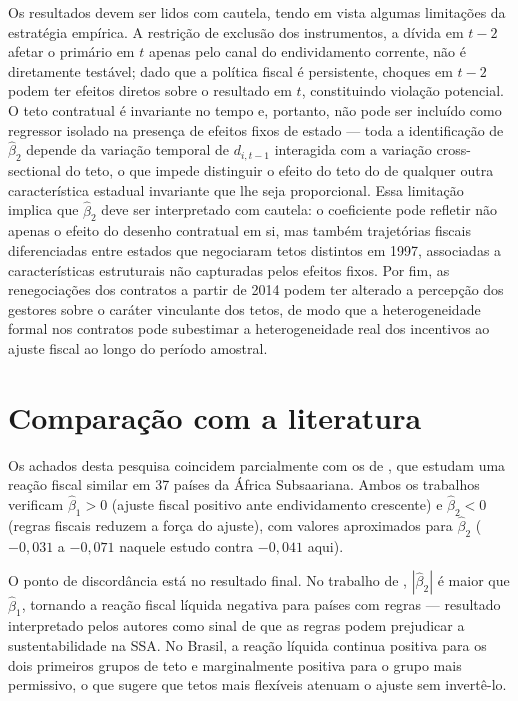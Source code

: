 Os resultados devem ser lidos com cautela, tendo em vista algumas limitações da estratégia empírica. A restrição de exclusão dos instrumentos, a dívida em $t-2$ afetar o primário em $t$ apenas pelo canal do endividamento corrente, não é diretamente testável; dado que a política fiscal é persistente, choques em $t-2$ podem ter efeitos diretos sobre o resultado em $t$, constituindo violação potencial. O teto contratual é invariante no tempo e, portanto, não pode ser incluído como regressor isolado na presença de efeitos fixos de estado --- toda a identificação de $\hat{\beta}_2$ depende da variação temporal de $d_{i,t-1}$ interagida com a variação cross-sectional do teto, o que impede distinguir o efeito do teto do de qualquer outra característica estadual invariante que lhe seja proporcional. Essa limitação implica que $\hat{\beta}_2$ deve ser interpretado com cautela: o coeficiente pode refletir não apenas o efeito do desenho contratual em si, mas também trajetórias fiscais diferenciadas entre estados que negociaram tetos distintos em 1997, associadas a características estruturais não capturadas pelos efeitos fixos. Por fim, as renegociações dos contratos a partir de 2014 podem ter alterado a percepção dos gestores sobre o caráter vinculante dos tetos, de modo que a heterogeneidade formal nos contratos pode subestimar a heterogeneidade real dos incentivos ao ajuste fiscal ao longo do período amostral.

\section{Comparação com a literatura}
\label{sec:comparacao}

Os achados desta pesquisa coincidem parcialmente com os de , que estudam uma reação fiscal similar em 37 países da África Subsaariana. Ambos os trabalhos verificam $\hat{\beta}_1 > 0$ (ajuste fiscal positivo ante endividamento crescente) e $\hat{\beta}_2 < 0$ (regras fiscais reduzem a força do ajuste), com valores aproximados para $\hat{\beta}_2$ ($-0{,}031$ a $-0{,}071$ naquele estudo contra $-0{,}041$ aqui).

O ponto de discordância está no resultado final. No trabalho de , $|\hat{\beta}_2|$ é maior que $\hat{\beta}_1$, tornando a reação fiscal líquida negativa para países com regras --- resultado interpretado pelos autores como sinal de que as regras podem prejudicar a sustentabilidade na SSA. No Brasil, a reação líquida continua positiva para os dois primeiros grupos de teto e marginalmente positiva para o grupo mais permissivo, o que sugere que tetos mais flexíveis atenuam o ajuste sem invertê-lo.

